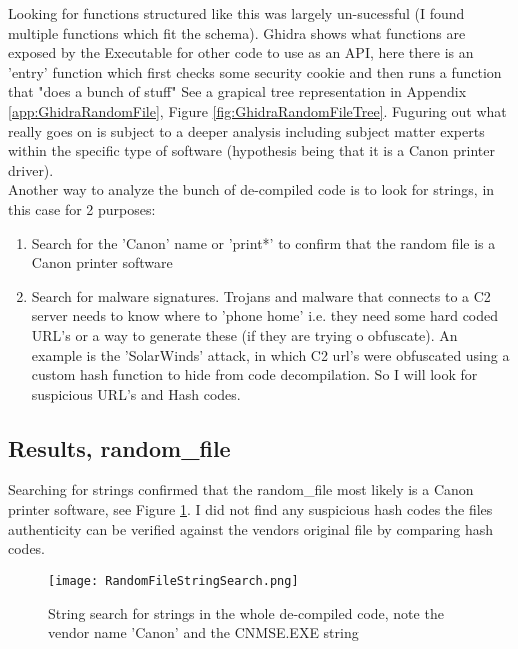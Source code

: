 \documentclass[
	letterpaper, %
	10pt, %
	unnumberedsections, %
	twoside, %
]{APAAssignment}
\begin{document}
Looking for functions structured like this was largely un-sucessful (I found multiple functions which fit the schema). Ghidra shows what functions are exposed by the Executable for other code to use as an API, here there is an 'entry' function which first checks some security cookie and then runs a function that "does a bunch of stuff" See a grapical tree representation in Appendix \ref{app:GhidraRandomFile}, Figure \ref{fig:GhidraRandomFileTree}. Fuguring out what really goes on is subject to a deeper analysis including subject matter experts within the specific type of software (hypothesis being that it is a Canon printer driver). \\
Another way to analyze the bunch of de-compiled code is to look for strings, in this case for 2 purposes:
\begin{enumerate}
	\item Search for the 'Canon' name or 'print*' to confirm that the random file is a Canon printer software
	\item Search for malware signatures. Trojans and malware that connects to a C2 server needs to know where to 'phone home' i.e. they need some hard coded URL's or a way to generate these (if they are trying o obfuscate). An example is the 'SolarWinds' attack, in which C2 url's were obfuscated using a custom hash function to hide from code decompilation. So I will look for suspicious URL's and Hash codes. 
\end{enumerate}

\subsection{Results, random\_file}
Searching for strings confirmed that the random\_file most likely is a Canon printer software, see Figure \ref{fig:GhidraRandomFileString}. I did not find any suspicious hash codes the files authenticity can be verified against the vendors original file by comparing hash codes.

\begin{figure}[!htp] %
	\centering
	\texttt{[image: RandomFileStringSearch.png]}
	\caption{String search for strings in the whole de-compiled code, note the vendor name 'Canon' and the CNMSE.EXE string}
	\label{fig:GhidraRandomFileString}
\end{figure}
\end{document}
